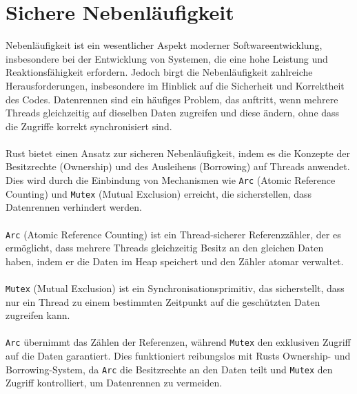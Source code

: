 \chapter{Sichere Nebenläufigkeit}

Nebenläufigkeit ist ein wesentlicher Aspekt moderner Softwareentwicklung, insbesondere bei der Entwicklung von Systemen, die eine hohe Leistung und Reaktionsfähigkeit erfordern. 
Jedoch birgt die Nebenläufigkeit zahlreiche Herausforderungen, insbesondere im Hinblick auf die Sicherheit und Korrektheit des Codes.
Datenrennen sind ein häufiges Problem, das auftritt, wenn mehrere Threads gleichzeitig auf dieselben Daten zugreifen und diese ändern, ohne dass die Zugriffe korrekt synchronisiert sind.\\ 
\\
Rust bietet einen Ansatz zur sicheren Nebenläufigkeit, indem es die Konzepte der Besitzrechte (Ownership) und des Ausleihens (Borrowing) auf Threads anwendet. 
Dies wird durch die Einbindung von Mechanismen wie \texttt{Arc} (Atomic Reference Counting) und \texttt{Mutex} (Mutual Exclusion) erreicht, die sicherstellen, dass Datenrennen verhindert werden.\\
\\
\texttt{Arc} (Atomic Reference Counting) ist ein Thread-sicherer Referenzzähler, der es ermöglicht, dass mehrere Threads gleichzeitig Besitz an den gleichen Daten haben, indem er die Daten im Heap speichert und den Zähler atomar verwaltet. \\
\\
\texttt{Mutex} (Mutual Exclusion) ist ein Synchronisationsprimitiv, das sicherstellt, dass nur ein Thread zu einem bestimmten Zeitpunkt auf die geschützten Daten zugreifen kann.\\
\\
\texttt{Arc} übernimmt das Zählen der Referenzen, während \texttt{Mutex} den exklusiven Zugriff auf die Daten garantiert. 
Dies funktioniert reibungslos mit Rusts Ownership- und Borrowing-System, da \texttt{Arc} die Besitzrechte an den Daten teilt und \texttt{Mutex} den Zugriff kontrolliert, um Datenrennen zu vermeiden. 
\cleardoublepage
